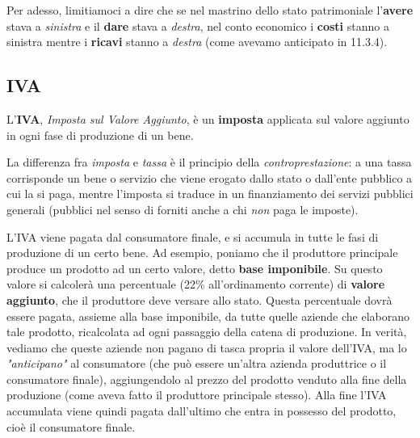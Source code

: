 \documentclass[a4paper,11pt]{article}
\begin{document}
Per adesso, limitiamoci a dire che se nel mastrino dello stato patrimoniale l'\textbf{avere} stava a \textit{sinistra} e il \textbf{dare} stava a \textit{destra}, nel conto economico i \textbf{costi} stanno a sinistra mentre i \textbf{ricavi} stanno a \textit{destra} (come avevamo anticipato in 11.3.4).

\subsection{IVA}
L'\textbf{IVA}, \textit{Imposta sul Valore Aggiunto}, è un \textbf{imposta} applicata sul valore aggiunto in ogni fase di produzione di un bene.

\par\smallskip

La differenza fra \textit{imposta} e \textit{tassa} è il principio della \textit{controprestazione}: a una tassa corrisponde un bene o servizio che viene erogato dallo stato o dall'ente pubblico a cui la si paga, mentre l'imposta si traduce in un finanziamento dei servizi pubblici generali (pubblici nel senso di forniti anche a chi \textit{non} paga le imposte). 

\par\smallskip

L'IVA viene pagata dal consumatore finale, e si accumula in tutte le fasi di produzione di un certo bene.
Ad esempio, poniamo che il produttore principale produce un prodotto ad un certo valore, detto \textbf{base imponibile}.
Su questo valore si calcolerà una percentuale (22\% all'ordinamento corrente) di \textbf{valore aggiunto}, che il produttore deve versare allo stato.
Questa percentuale dovrà essere pagata, assieme alla base imponibile, da tutte quelle aziende che elaborano tale prodotto, ricalcolata ad ogni passaggio della catena di produzione.
In verità, vediamo che queste aziende non pagano di tasca propria il valore dell'IVA, ma lo \textit{"anticipano"} al consumatore (che può essere un'altra azienda produttrice o il consumatore finale), aggiungendolo al prezzo del prodotto venduto alla fine della produzione (come aveva fatto il produttore principale stesso).
Alla fine l'IVA accumulata viene quindi pagata dall'ultimo che entra in possesso del prodotto, cioè il consumatore finale.
\end{document}

